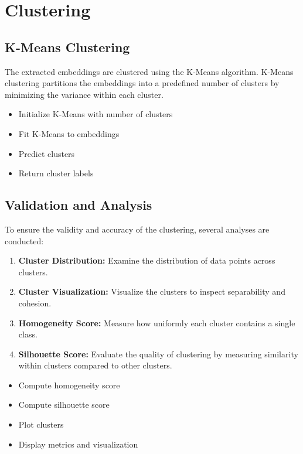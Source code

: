 \section{Clustering}
\subsection{K-Means Clustering}
The extracted embeddings are clustered using the K-Means algorithm. K-Means clustering partitions the embeddings into a predefined number of clusters by minimizing the variance within each cluster.

\begin{schema}
    \begin{itemize}
        \item Initialize K-Means with number of clusters
        \item Fit K-Means to embeddings
        \item Predict clusters
        \item Return cluster labels
    \end{itemize}
\end{schema}

\subsection{Validation and Analysis}
To ensure the validity and accuracy of the clustering, several analyses are conducted:
\begin{enumerate}
    \item \textbf{Cluster Distribution:} Examine the distribution of data points across clusters.
    \item \textbf{Cluster Visualization:} Visualize the clusters to inspect separability and cohesion.
    \item \textbf{Homogeneity Score:} Measure how uniformly each cluster contains a single class.
    \item \textbf{Silhouette Score:} Evaluate the quality of clustering by measuring similarity within clusters compared to other clusters.
\end{enumerate}

\begin{schema}
    \begin{itemize}
        \item Compute homogeneity score
        \item Compute silhouette score
        \item Plot clusters
        \item Display metrics and visualization
    \end{itemize}
\end{schema}


